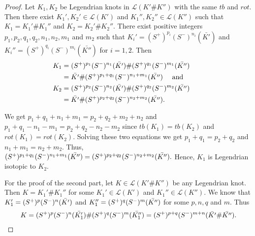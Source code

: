 \documentclass[11pt]{amsart}
\numberwithin{equation}{section}
\theoremstyle{plain}
\theoremstyle{definition}
\theoremstyle{remark} \newtheorem{remark}[equation]{Remark}
\theoremstyle{remark} \newtheorem{observation}[equation]{Observation}
\begin{document}
\begin{proof}
    Let $K_1,K_2$ be Legendrian knots in $\mathcal{L}(K'\#K'')$ with the same $tb$ and $rot$. Then there exist $K_1', K_2'\in \mathcal{L}(K')$ and $K_1'', K_2'' \in \mathcal{L}(K'')$ such that $K_1=K_1'\#K_1''$ and $K_2=K_2'\#K_2''$. There exist positive integers $p_1,p_2,q_1,q_2,n_1,n_2,m_1$ and $m_2$ such that $K_i'=(S^+)^{p_i}(S^-)^{n_i}(\bar{K'})$ and $K_i''=(S^+)^{q_i}(S^-)^{m_i}(\bar{K''})$ for $i=1,2.$ Then 
 \begin{align*}
        K_1&=(S^+)^{p_1}(S^-)^{n_1}(\bar{K'})\#(S^+)^{q_1}(S^-)^{m_1}(\bar{K''})\\
        &=\Bar{K'}\#(S^+)^{p_1+q_1}(S^-)^{n_1+m_1}(\Bar{K''}) \quad \text{ and }\\
        K_2&=(S^+)^{p_2}(S^-)^{n_2}(\bar{K'})\#(S^+)^{q_2}(S^-)^{m_2}(\bar{K''})\\
        &=\Bar{K'}\#(S^+)^{p_2+q_2}(S^-)^{n_2+m_2}(\Bar{K''}).&&
    \end{align*}

We get $p_1+q_1+n_1+m_1=p_2+q_2+m_2+n_2$ and $p_1+q_1-n_1-m_1=p_2+q_2-n_2-m_2$ since $tb(K_1)=tb(K_2)$ and $rot(K_1)=rot(K_2)$. Solving these two equations we get $p_1+q_1=p_2+q_2$ and $n_1+m_1=n_2+m_2$. Thus, $(S^+)^{p_1+q_1}(S^-)^{n_1+m_1}(\Bar{K''})=(S^+)^{p_2+q_2}(S^-)^{n_2+m_2}(\Bar{K''}).$ Hence, $K_1$ is Legendrian isotopic to $K_2$.

     For the proof of the second part, let $K\in \mathcal{L}(K'\#K'')$ be any Legendrian knot. Then $K=K_1'\#K_1''$ for some $K_1'\in \mathcal{L}(K')$ and $K_1''\in \mathcal{L}(K'')$. We know that $K_1'=(S^+)^{p}(S^-)^{n}(\Bar{K'})$ and $K_1''=(S^+)^{q}(S^-)^{m}(\Bar{K''})$ for some $p,n,q$ and $m$. Thus
     \begin{align*}
         K=(S^+)^{p}(S^-)^{n}(\Bar{K_1'})\#(S^+)^{q}(S^-)^{m}(\Bar{K_1''})=(S^+)^{p+q}(S^-)^{m+n}(\Bar{K'}\#\Bar{K''}).
     \end{align*}
\end{proof}
\end{document}
